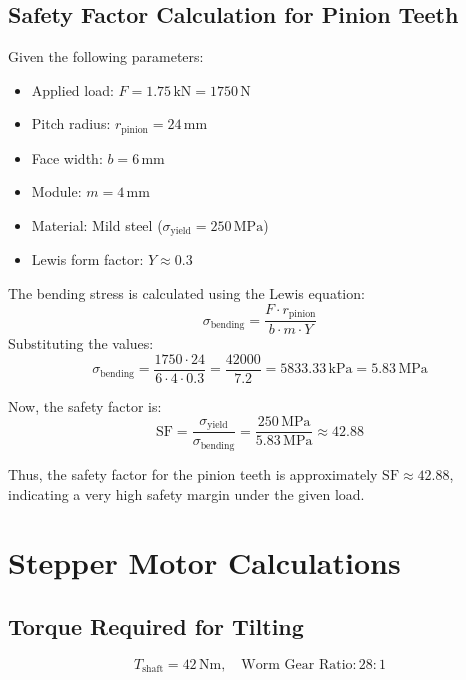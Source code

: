 \subsection*{Safety Factor Calculation for Pinion Teeth}
\label{calcs:pinion-SF}
\small %

Given the following parameters:
\begin{itemize}
    \item Applied load: \( F = 1.75 \, \text{kN} = 1750 \, \text{N} \)
    \item Pitch radius: \( r_{\text{pinion}} = 24 \, \text{mm} \)
    \item Face width: \( b = 6 \, \text{mm} \)
    \item Module: \( m = 4 \, \text{mm} \)
    \item Material: Mild steel (\( \sigma_{\text{yield}} = 250 \, \text{MPa} \))
    \item Lewis form factor: \( Y \approx 0.3 \)
\end{itemize}

The bending stress is calculated using the Lewis equation:
\[
\sigma_{\text{bending}} = \frac{F \cdot r_{\text{pinion}}}{b \cdot m \cdot Y}
\]
Substituting the values:
\[
\sigma_{\text{bending}} = \frac{1750 \cdot 24}{6 \cdot 4 \cdot 0.3} = \frac{42000}{7.2} = 5833.33 \, \text{kPa} = 5.83 \, \text{MPa}
\]

Now, the safety factor is:
\[
\text{SF} = \frac{\sigma_{\text{yield}}}{\sigma_{\text{bending}}} = \frac{250 \, \text{MPa}}{5.83 \, \text{MPa}} \approx 42.88
\]

Thus, the safety factor for the pinion teeth is approximately \( \text{SF} \approx 42.88 \), indicating a very high safety margin under the given load.

\normalsize %

\section{Stepper Motor Calculations}
\label{calcs:stepper-motor}

\small %

\subsection*{Torque Required for Tilting}


\[
T_{\text{shaft}} = 42 \, \text{Nm}, \quad \text{Worm Gear Ratio:} \, 28:1
\]

